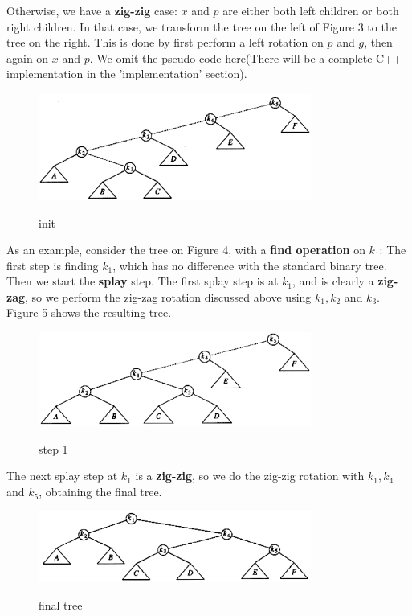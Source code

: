 \documentclass[a4paper,11pt]{article}
\begin{document}
Otherwise, we have a \textbf{zig-zig} case: $x$ and $p$ are either both left children or both right children. In that case, we transform the tree on the left of Figure 3 to the tree on the right. This is done by first perform a left rotation on $p$ and $g$, then again on $x$ and $p$. We omit the pseudo code here(There will be a complete C++ implementation in the 'implementation' section).

\begin{figure}
  \centering
  \includegraphics[width=0.8\textwidth]{step_0}\\
  \caption{init}%
\end{figure}

As an example, consider the tree on Figure 4, with a \textbf{find operation} on $k_1$:
The first step is finding $k_1$, which has no difference with the standard binary tree. Then we start the \textbf{splay} step. The first splay step is at $k_1$, and is clearly a \textbf{zig-zag}, so we perform the zig-zag rotation discussed above using $k_1, k_2$ and $k_3$. Figure 5 shows the resulting tree.

\begin{figure}
  \centering
  \includegraphics[width=0.8\textwidth]{step_1}\\
  \caption{step 1}%
\end{figure}

The next splay step at $k_1$ is a \textbf{zig-zig}, so we do the zig-zig rotation with $k_1, k_4$ and $k_5$, obtaining the final tree.

\begin{figure}
  \centering
  \includegraphics[width=0.8\textwidth]{step_2}\\
  \caption{final tree}%
\end{figure}
\end{document}
